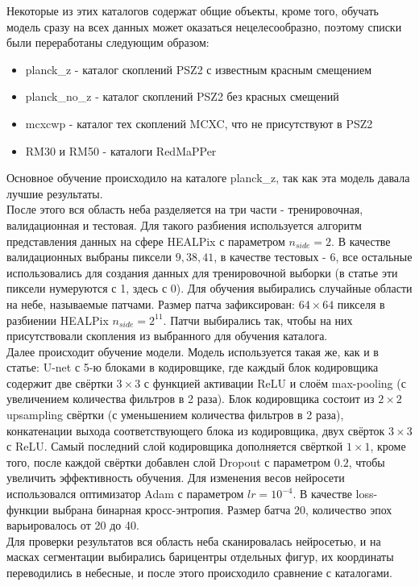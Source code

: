 Некоторые из этих каталогов содержат общие объекты, кроме того, обучать модель сразу на всех данных 
может оказаться нецелесообразно, поэтому списки были переработаны следующим образом:\\
\begin{itemize}
    \item planck\_z - каталог скоплений PSZ2 с известным красным смещением\\
    \item planck\_no\_z - каталог скоплений PSZ2 без красных смещений\\
    \item mcxcwp - каталог тех скоплений MCXC, что не присутствуют в PSZ2\\
    \item RM30 и RM50 - каталоги RedMaPPer\\
\end{itemize}

Основное обучение происходило на каталоге planck\_z, так как эта модель давала лучшие результаты.\\

После этого вся область неба разделяется на три части - тренировочная, валидационная и тестовая.
Для такого разбиения используется алгоритм представления данных на сфере HEALPix с параметром 
$n_{side} = 2$. В качестве валидационных выбраны пиксели $9, 38, 41$, в качестве тестовых - $6$, все 
остальные использовались для создания данных для тренировочной выборки (в статье \cite{Bonjean} 
эти пиксели нумеруются с 1, здесь с 0).
Для обучения выбирались случайные области на небе, называемые патчами. Размер патча зафиксирован: 
$64 \times 64$ пикселя в разбиении HEALPix $n_{side}=2^{11}$. Патчи выбирались так, чтобы на них 
присутствовали скопления из выбранного для обучения каталога.\\

Далее происходит обучение модели. Модель используется такая же, как и в статье: U-net с 5-ю блоками в
кодировщике, где каждый блок кодировщика содержит две свёртки $3 \times 3$ с функцией активации 
ReLU и слоём max-pooling (с увеличением количества фильтров в 2 раза). Блок кодировщика состоит из 
$2 \times 2$ upsampling свёртки (с уменьшением количества фильтров в 2 раза), конкатенации
выхода соответствующего блока из кодировщика, двух свёрток $3 \times 3$ с ReLU. Самый последний 
слой кодировщика дополняется свёрткой $1 \times 1$, кроме того, после каждой свёртки добавлен слой 
Dropout с параметром $0.2$, чтобы увеличить эффективность обучения. Для изменения весов нейросети 
использовался оптимизатор Adam с параметром $lr = 10^{-4}$. В качестве loss-функции выбрана бинарная 
кросс-энтропия. Размер батча $20$, количество эпох варьировалось от 20 до 40.\\

Для проверки результатов вся область неба сканировалась нейросетью, и на масках сегментации 
выбирались барицентры отдельных фигур, их координаты переводились в небесные, и после этого 
происходило сравнение с каталогами.\\



